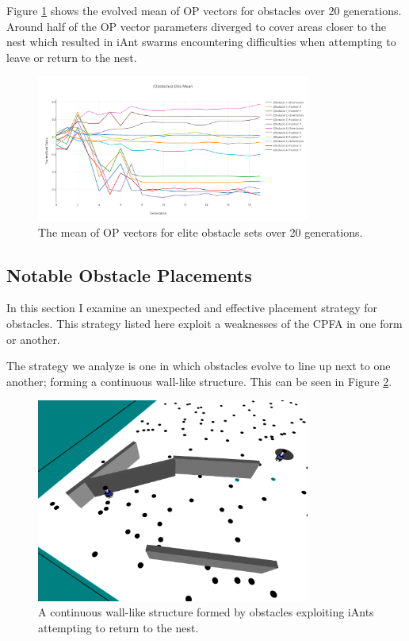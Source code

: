 \documentclass{acm_proc_article-sp}
\begin{document}
Figure \ref{fig:obstaclemean20} shows the evolved mean of OP vectors for obstacles over 20 generations. Around half of the OP vector parameters diverged to cover areas closer to the nest which resulted in iAnt swarms encountering difficulties when attempting to leave or return to the nest.

\begin{figure}[h]
	\includegraphics[width=9cm]{images/ObstaclesEliteMean20}
	\caption{The mean of OP vectors for elite obstacle sets over 20 generations.} 
	\label{fig:obstaclemean20}
\end{figure}



\subsection{Notable Obstacle Placements}

In this section I examine an unexpected and effective placement strategy for obstacles. This strategy listed here exploit a weaknesses of the CPFA in one form or another.

The strategy we analyze is one in which obstacles evolve to line up next to one another; forming a continuous wall-like structure. This can be seen in Figure \ref{fig:obs1}.

\begin{figure}[h]
	\includegraphics[width=9cm]{images/obs1}
	\caption{A continuous wall-like structure formed by obstacles exploiting iAnts attempting to return to the nest.} 
	\label{fig:obs1}
\end{figure}
\end{document}
